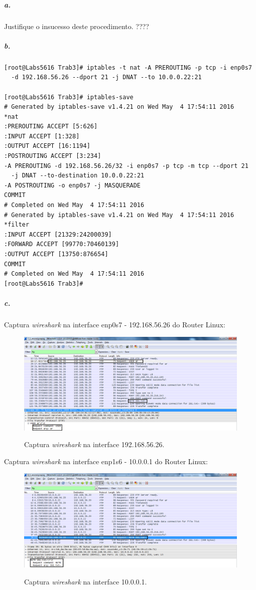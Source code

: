 \subparagraph{a.}

Justifique o insucesso deste procedimento. ????


\subparagraph{b.}
\begin{verbatim}
[root@Labs5616 Trab3]# iptables -t nat -A PREROUTING -p tcp -i enp0s7 
  -d 192.168.56.26 --dport 21 -j DNAT --to 10.0.0.22:21

[root@Labs5616 Trab3]# iptables-save
# Generated by iptables-save v1.4.21 on Wed May  4 17:54:11 2016
*nat
:PREROUTING ACCEPT [5:626]
:INPUT ACCEPT [1:328]
:OUTPUT ACCEPT [16:1194]
:POSTROUTING ACCEPT [3:234]
-A PREROUTING -d 192.168.56.26/32 -i enp0s7 -p tcp -m tcp --dport 21 
  -j DNAT --to-destination 10.0.0.22:21
-A POSTROUTING -o enp0s7 -j MASQUERADE
COMMIT
# Completed on Wed May  4 17:54:11 2016
# Generated by iptables-save v1.4.21 on Wed May  4 17:54:11 2016
*filter
:INPUT ACCEPT [21329:24200039]
:FORWARD ACCEPT [99770:70460139]
:OUTPUT ACCEPT [13750:876654]
COMMIT
# Completed on Wed May  4 17:54:11 2016
[root@Labs5616 Trab3]# 
\end{verbatim}


\subparagraph{c.}
Captura \emph{wireshark} na interface \textsf{enp0s7 - 192.168.56.26} do \textsf{Router Linux}:

\begin{figure}[h]
\centering
\includegraphics[width=1\textwidth, height=0.3\textheight]{5_b-enp0s7.png}
\label{fig:enp0s7}
\caption{Captura \emph{wireshark} na interface \textsf{192.168.56.26}.}
\end{figure}

Captura \emph{wireshark} na interface \textsf{enp1s6 - 10.0.0.1} do \textsf{Router Linux}:

\begin{figure}[h]
\centering
\includegraphics[width=1\textwidth, height=0.3\textheight]{5_b-enp1s6.png}
\label{fig:enp1s6}
\caption{Captura \emph{wireshark} na interface \textsf{10.0.0.1}.}
\end{figure}

